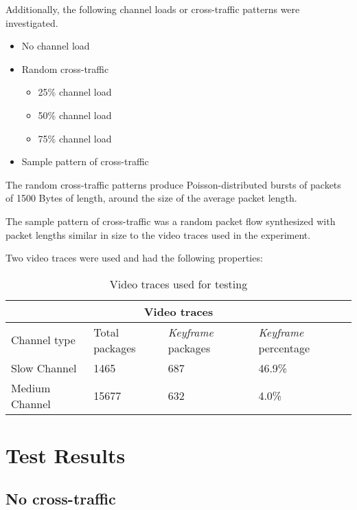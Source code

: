 Additionally, the following channel loads or cross-traffic patterns were investigated.

\begin{itemize}
	\item{No channel load}
	\item{Random cross-traffic}
		\begin{itemize}
			\item{25\% channel load}
			\item{50\% channel load}
			\item{75\% channel load}
		\end{itemize}
	\item{Sample pattern of cross-traffic}
\end{itemize}

The random cross-traffic patterns produce Poisson-distributed bursts of packets of 1500 Bytes of length, around the size of the average packet length. 

The sample pattern of cross-traffic was a random packet flow synthesized with packet lengths similar in size to the video traces used in the experiment.

Two video traces were used and had the following properties:

\begin{table}[htbp]
\break
\setlength{\arrayrulewidth}{1mm}
\setlength{\tabcolsep}{12pt}
\renewcommand{\arraystretch}{1.5}
 {
\begin{tabular}{ |p{3cm}|p{3cm}|p{3cm}|p{3cm}|  }
\hline
\multicolumn{4}{|c|}{Video traces} \\
\hline
Channel type & Total packages & \textit{Keyframe} packages & \textit{Keyframe} percentage\\
\hline
Slow Channel & 1465 & 687 & 46.9\%\\
Medium Channel & 15677 & 632 & 4.0\%\\

\hline
\end{tabular}
}
\caption{Video traces used for testing}
\end{table}




\section{Test Results}

\subsection{No cross-traffic}

